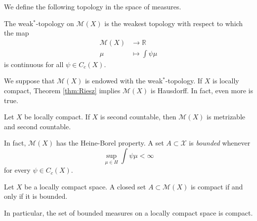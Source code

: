 We define the following topology in the space of measures.

\begin{definition} The weak$^*$-topology on $\mathcal{M}(X)$ is the weakest topology with respect to which the map
\begin{align*}
  \mathcal{M}(X) &\to \mathbb{R}\\
  \mu &\mapsto \int \psi \mu
\end{align*}
is continuous for all $\psi \in C_c(X)$.
\end{definition}

We suppose that $\mathcal{M}(X)$ is endowed with the weak$^*$-topology.
If $X$ is locally compact, Theorem \ref{thm:Riesz} implies $\mathcal{M}(X)$ is Hausdorff.
In fact, even more is true.

\begin{theorem}
Let $X$ be locally compact. If $X$ is second countable, then $\mathcal{M}(X)$ is metrizable and second countable.
\label{thm:spacemeasureswell}
\end{theorem}

In fact, $\mathcal{M}(X)$ has the Heine-Borel property.
A set $A \subset \mathcal{X}$ is \emph{bounded} whenever
\[
  \sup_{\mu \in H} \int \psi \mu < \infty
\]
for every $\psi \in C_c(X)$.

\begin{theorem}
Let $X$ be a locally compact space. A closed set $A \subset \mathcal{M}(X)$ is compact if and only if it is bounded.
\label{thm:heineborelproperty}
\end{theorem}

In particular, the set of bounded measures on a locally compact space is compact.


